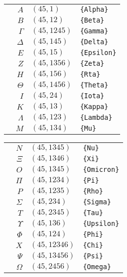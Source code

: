 \documentclass[draft]{article}
\newcommand{\myagtable}[1]{%
	\enskip\begin{tabular}[t]{l|r|l|l} 
		\hline #1 \hline
	\end{tabular}\enskip}
\begin{document}
\begin{center}
	\myagtable{
		\braille{{Alpha}}    & $A$        & $(45,1)$     & \texttt{\{Alpha\}}   \\
		\braille{{Beta}}     & $B$        & $(45,12)$    & \texttt{\{Beta\}}    \\
		\braille{{Gamma}}    & $\Gamma$   & $(45,1245)$  & \texttt{\{Gamma\}}   \\
		\braille{{Delta}}    & $\Delta$   & $(45,145)$   & \texttt{\{Delta\}}   \\
		\braille{{Epsilon}}  & $E$        & $(45,15)$    & \texttt{\{Epsilon\}} \\
		\braille{{Zeta}}     & $Z$        & $(45,1356)$  & \texttt{\{Zeta\}}    \\
		\braille{{Eta}}      & $H$        & $(45,156)$   & \texttt{\{Rta\}}     \\   
		\braille{{Theta}}    & $\Theta$   & $(45,1456)$  & \texttt{\{Theta\}}   \\
		\braille{{Iota}}     & $I$        & $(45,24)$    & \texttt{\{Iota\}}    \\ 
		\braille{{Kappa}}    & $K$        & $(45,13)$    & \texttt{\{Kappa\}}   \\
		\braille{{Lambda}}   & $\Lambda$  & $(45,123)$   & \texttt{\{Lambda\}}  \\
		\braille{{Mu}}       & $M$        & $(45,134)$   & \texttt{\{Mu\}}      \\	
	}
	\myagtable{
		\braille{{Nu}}       & $N$        & $(45,1345)$  & \texttt{\{Nu\}}      \\
		\braille{{Xi}}       & $\Xi$      & $(45,1346)$  & \texttt{\{Xi\}}      \\
		\braille{{Omicron}}  & $O$        & $(45,1345)$  & \texttt{\{Omicron\}} \\
		\braille{{Pi}}       & $\Pi$      & $(45,1234)$  & \texttt{\{Pi\}}      \\
		\braille{{Rho}}      & $P$        & $(45,1235)$  & \texttt{\{Rho\}}     \\
		\braille{{Sigma}}    & $\Sigma$   & $(45,234)$   & \texttt{\{Sigma\}}   \\
		\braille{{Tau}}      & $T$        & $(45,2345)$  & \texttt{\{Tau\}}     \\
		\braille{{Upsilon}}  & $\Upsilon$ & $(45,136)$   & \texttt{\{Upsilon\}} \\
		\braille{{Phi}}      & $\Phi$     & $(45,124)$   & \texttt{\{Phi\}}     \\
		\braille{{Chi}}      & $X$        & $(45,12346)$ & \texttt{\{Chi\}}     \\
		\braille{{Psi}}      & $\Psi$     & $(45,13456)$ & \texttt{\{Psi\}}     \\
		\braille{{Omega}}    & $\Omega$   & $(45,2456)$  & \texttt{\{Omega\}}   \\
	}
\end{center}
\end{document}
